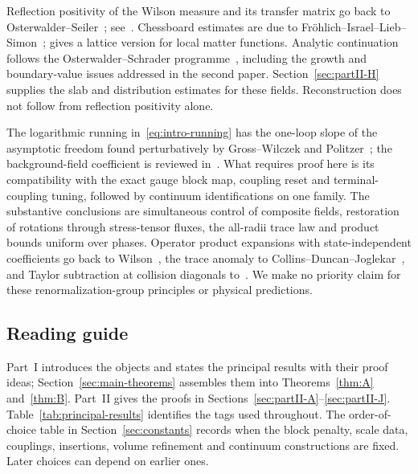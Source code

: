 Reflection positivity of the Wilson measure and its transfer matrix go back to Osterwalder--Seiler~\cite{OsterwalderSeiler1978}; see~\cite[\S2a, Theorem~2.1]{Seiler1982}. Chessboard estimates are due to Fr\"ohlich--Israel--Lieb--Simon~\cite[\S4, Theorems~4.1--4.2]{FrohlichIsraelLiebSimon1978}; \cite[Theorem~2.2]{Seiler1982} gives a lattice version for local matter functions. Analytic continuation follows the Osterwalder--Schrader programme~\cite{OsterwalderSchrader1973,OsterwalderSchrader1975}, including the growth and boundary-value issues addressed in the second paper. Section~\ref{sec:partII-H} supplies the slab and distribution estimates for these fields. Reconstruction does not follow from reflection positivity alone.

The logarithmic running in~\eqref{eq:intro-running} has the one-loop slope of the asymptotic freedom found perturbatively by Gross--Wilczek and Politzer~\cite{GrossWilczek1973,Politzer1973}; the background-field coefficient is reviewed in~\cite[\S3.3]{Abbott1982}. What requires proof here is its compatibility with the exact gauge block map, coupling reset and terminal-coupling tuning, followed by continuum identifications on one family. The substantive conclusions are simultaneous control of composite fields, restoration of rotations through stress-tensor fluxes, the all-radii trace law and product bounds uniform over phases. Operator product expansions with state-independent coefficients go back to Wilson~\cite[\S II]{Wilson1969}, the trace anomaly to Collins--Duncan--Joglekar~\cite[(3.19)--(3.21)]{CollinsDuncanJoglekar1977}, and Taylor subtraction at collision diagonals to~\cite[\S5.2]{BrunettiFredenhagen2000}. We make no priority claim for these renormalization-group principles or physical predictions.

\subsection{Reading guide}

Part~I introduces the objects and states the principal results with their proof ideas; Section~\ref{sec:main-theorems} assembles them into Theorems~\ref{thm:A} and~\ref{thm:B}. Part~II gives the proofs in Sections~\ref{sec:partII-A}--\ref{sec:partII-J}. Table~\ref{tab:principal-results} identifies the tags used throughout. The order-of-choice table in Section~\ref{sec:constants} records when the block penalty, scale data, couplings, insertions, volume refinement and continuum constructions are fixed. Later choices can depend on earlier ones.

